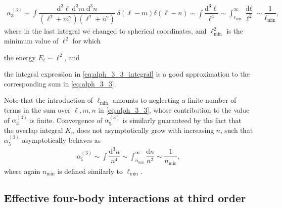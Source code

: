 \documentclass[preprint,showkeys,nofootinbib]{revtex4-1}
\renewcommand{\t}{\text} %
\newcommand{\f}{\dfrac} %
\newcommand{\p}[1]{\left(#1\right)} %
\renewcommand{\d}{\text{d}}
\newcommand{\1}{\mathds{1}}
\begin{document}
\begin{align}
  \alpha_3^{(3)}
  \sim \int \f{\d^3\ell~\d^3m~\d^3n}{\p{\ell^2+m^2}\p{\ell^2+n^2}}
  ~\delta\p{\ell-m}\delta\p{\ell-n}
  \sim \int \f{\d^3\ell}{\ell^4}
  \sim \int_{\ell_{\t{min}}}^\infty \f{\d\ell}{\ell^2}
  \sim \f1{\ell_{\t{min}}},
  \label{eq:alph_3_3_integral}
\end{align}
where in the last integral we changed to spherical coordinates, and
$\ell_{\t{min}}^2$ is the minimum value of $\ell^2$ for which
\begin{enumerate*}
\item the energy $E_\ell\sim\ell^2$, and
\item the integral expression in \eqref{eq:alph_3_3_integral} is a
  good approximation to the corresponding sum in \eqref{eq:alph_3_3}.
\end{enumerate*}
Note that the introduction of $\ell_{\t{min}}$ amounts to neglecting a
finite number of terms in the sum over $\ell,m,n$ in
\eqref{eq:alph_3_3}, whose contribution to the value of
$\alpha_3^{(3)}$ is finite.  Convergence of $\alpha_5^{(3)}$ is
similarly guaranteed by the fact that the overlap integral $K_n$ does
not asymptotically grow with increasing $n$, such that
$\alpha_5^{(3)}$ asymptotically behaves as
\begin{align}
  \alpha_5^{(3)} \sim \int \f{\d^3 n}{n^4}
  \sim \int_{n_{\t{min}}}^\infty \f{\d n}{n^2}
  \sim \f1{n_{\t{min}}},
  \label{eq:alph_5_3_integral}
\end{align}
where again $n_{\t{min}}$ is defined similarly to $\ell_{\t{min}}$.


\subsection{Effective four-body interactions at third order}
\end{document}
